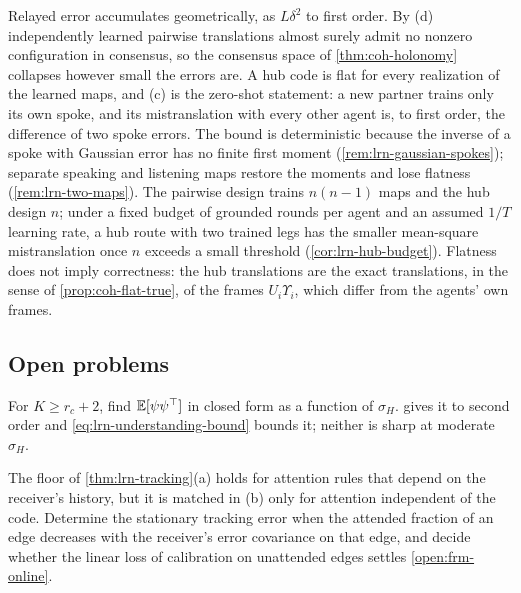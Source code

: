Relayed error accumulates geometrically, as $L\delta^2$ to first order. By (d) independently learned pairwise translations almost surely admit no nonzero configuration in consensus, so the consensus space of \cref{thm:coh-holonomy} collapses however small the errors are. A hub code is flat for every realization of the learned maps, and (c) is the zero-shot statement: a new partner trains only its own spoke, and its mistranslation with every other agent is, to first order, the difference of two spoke errors. The bound is deterministic because the inverse of a spoke with Gaussian error has no finite first moment (\cref{rem:lrn-gaussian-spokes}); separate speaking and listening maps restore the moments and lose flatness (\cref{rem:lrn-two-maps}). The pairwise design trains $n(n-1)$ maps and the hub design $n$; under a fixed budget of grounded rounds per agent and an assumed $1/T$ learning rate, a hub route with two trained legs has the smaller mean-square mistranslation once $n$ exceeds a small threshold (\cref{cor:lrn-hub-budget}). Flatness does not imply correctness: the hub translations are the exact translations, in the sense of \cref{prop:coh-flat-true}, of the frames $U_i\Upsilon_i$, which differ from the agents' own frames.

\subsection{Open problems}\label{sec:lrn-open}

\begin{openproblem}\label{open:lrn-noncentral}
For $K\ge r_c+2$, find $\mathbb{E}[\psi\psi^\top]$ in closed form as a function of $\sigma_H$.  gives it to second order and \cref{eq:lrn-understanding-bound} bounds it; neither is sharp at moderate $\sigma_H$.
\end{openproblem}

\begin{openproblem}\label{open:lrn-attention-feedback}
The floor of \cref{thm:lrn-tracking}(a) holds for attention rules that depend on the receiver's history, but it is matched in (b) only for attention independent of the code. Determine the stationary tracking error when the attended fraction of an edge decreases with the receiver's error covariance on that edge, and decide whether the linear loss of calibration on unattended edges settles \cref{open:frm-online}.
\end{openproblem}

